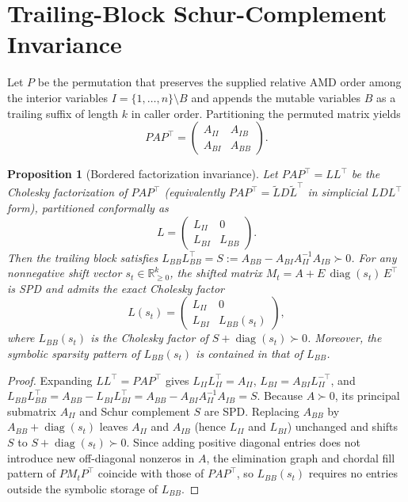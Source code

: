 \documentclass[10pt,letterpaper]{article}
\newtheorem{proposition}{Proposition}
\begin{document}
\section{Trailing-Block Schur-Complement Invariance}

Let $P$ be the permutation that preserves the supplied relative AMD order among the interior variables $I = \{1,\dots,n\} \setminus B$ and appends the mutable variables $B$ as a trailing suffix of length $k$ in caller order. Partitioning the permuted matrix yields
\[
P A P^\top = \begin{pmatrix} A_{II} & A_{IB} \\ A_{BI} & A_{BB} \end{pmatrix}.
\]

\begin{proposition}[Bordered factorization invariance]
Let $P A P^\top = L L^\top$ be the Cholesky factorization of $P A P^\top$ (equivalently $P A P^\top = \tilde{L} D \tilde{L}^\top$ in simplicial $LDL^\top$ form), partitioned conformally as
\[
L = \begin{pmatrix} L_{II} & 0 \\ L_{BI} & L_{BB} \end{pmatrix}.
\]
Then the trailing block satisfies $L_{BB} L_{BB}^\top = S := A_{BB} - A_{BI} A_{II}^{-1} A_{IB} \succ 0$. For any nonnegative shift vector $s_t \in \mathbb{R}_{\ge 0}^k$, the shifted matrix $M_t = A + E\,\operatorname{diag}(s_t)\,E^\top$ is SPD and admits the exact Cholesky factor
\[
L(s_t) = \begin{pmatrix} L_{II} & 0 \\ L_{BI} & L_{BB}(s_t) \end{pmatrix},
\]
where $L_{BB}(s_t)$ is the Cholesky factor of $S + \operatorname{diag}(s_t) \succ 0$. Moreover, the symbolic sparsity pattern of $L_{BB}(s_t)$ is contained in that of $L_{BB}$.
\end{proposition}

\begin{proof}
Expanding $L L^\top = P A P^\top$ gives $L_{II} L_{II}^\top = A_{II}$, $L_{BI} = A_{BI} L_{II}^{-\top}$, and $L_{BB} L_{BB}^\top = A_{BB} - L_{BI} L_{BI}^\top = A_{BB} - A_{BI} A_{II}^{-1} A_{IB} = S$. Because $A \succ 0$, its principal submatrix $A_{II}$ and Schur complement $S$ are SPD. Replacing $A_{BB}$ by $A_{BB} + \operatorname{diag}(s_t)$ leaves $A_{II}$ and $A_{IB}$ (hence $L_{II}$ and $L_{BI}$) unchanged and shifts $S$ to $S + \operatorname{diag}(s_t) \succ 0$. Since adding positive diagonal entries does not introduce new off-diagonal nonzeros in $A$, the elimination graph and chordal fill pattern of $P M_t P^\top$ coincide with those of $P A P^\top$, so $L_{BB}(s_t)$ requires no entries outside the symbolic storage of $L_{BB}$.
\end{proof}
\end{document}
